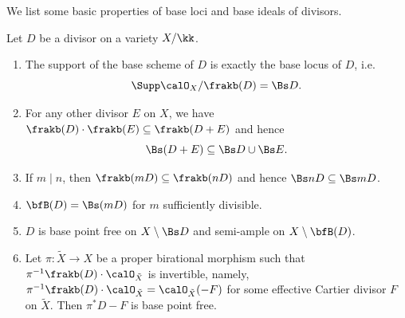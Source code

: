   We list some basic properties of base loci and base ideals of divisors.

  \begin{proposition}
    Let $D$ be a divisor on a variety $X/\kk$.
    \begin{enumerate}
      \item The support of the base scheme of $D$ is exactly the base locus of $D$, i.e. 
        \[ \Supp \calO_X/\frakb(D) = \Bs D. \]
      \item For any other divisor $E$ on $X$, we have $\frakb(D) \cdot \frakb(E) \subseteq \frakb(D+E)$ and hence 
      \[ \Bs(D+E) \subseteq \Bs D \cup \Bs E. \]
      \item If $m \mid n$, then $\frakb(mD) \subseteq \frakb(nD)$ and hence $\Bs nD \subseteq \Bs mD$.
      \item $\bfB(D) = \Bs (mD)$ for $m$ sufficiently divisible.
      \item $D$ is base point free on $X \setminus \Bs D$ and semi-ample on $X \setminus \bfB(D)$.
      \item Let $\pi: \tilde{X} \to X$ be a proper birational morphism such that $\pi^{-1} \frakb(D) \cdot \calO_{\tilde{X}}$ is invertible, namely, $\pi^{-1} \frakb(D) \cdot \calO_{\tilde{X}} = \calO_{\tilde{X}}(-F)$ for some effective Cartier divisor $F$ on $\tilde{X}$.
      Then $\pi^* D - F$ is base point free.
    \end{enumerate}
  \end{proposition}
